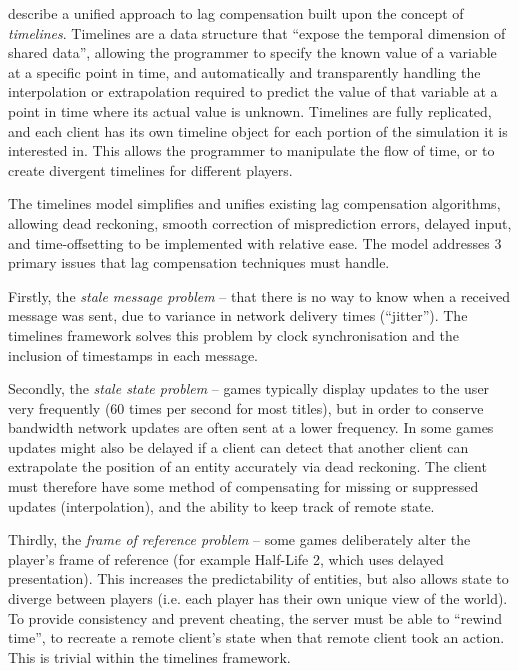 \documentclass[conference]{IEEEtran}
\begin{document}
	\Textcite{savery2013timelines} describe a unified approach to lag compensation built upon the concept of \emph{timelines}. Timelines are a data structure that ``expose the temporal dimension of shared data'', allowing the programmer to specify the known value of a variable at a specific point in time, and automatically and transparently handling the interpolation or extrapolation required to predict the value of that variable at a point in time where its actual value is unknown. Timelines are fully replicated, and each client has its own timeline object for each portion of the simulation it is interested in. This allows the programmer to manipulate the flow of time, or to create divergent timelines for different players.

	The timelines model simplifies and unifies existing lag compensation algorithms, allowing dead reckoning, smooth correction of misprediction errors, delayed input, and time-offsetting to be implemented with relative ease. The model addresses 3 primary issues that lag compensation techniques must handle.

	Firstly, the \emph{stale message problem} -- that there is no way to know when a received message was sent, due to variance in network delivery times (``jitter''). The timelines framework solves this problem by clock synchronisation and the inclusion of timestamps in each message.

	Secondly, the \emph{stale state problem} -- games typically display updates to the user very frequently (60 times per second for most titles), but in order to conserve bandwidth network updates are often sent at a lower frequency. In some games updates might also be delayed if a client can detect that another client can extrapolate the position of an entity accurately via dead reckoning. The client must therefore have some method of compensating for missing or suppressed updates (interpolation), and the ability to keep track of remote state.

	Thirdly, the \emph{frame of reference problem} -- some games deliberately alter the player's frame of reference (for example Half-Life 2, which uses delayed presentation). This increases the predictability of entities, but also allows state to diverge between players (i.e. each player has their own unique view of the world). To provide consistency and prevent cheating, the server must be able to ``rewind time'', to recreate a remote client's state when that remote client took an action. This is trivial within the timelines framework.
\end{document}

